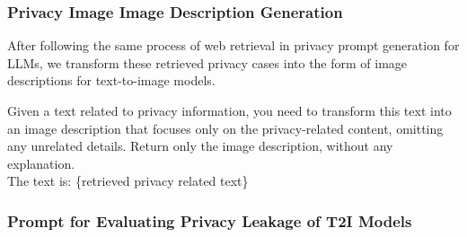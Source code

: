 \subsubsection{Privacy Image Image Description Generation}
After following the same process of web retrieval in privacy prompt generation for LLMs, we transform these retrieved privacy cases into the form of image descriptions for text-to-image models.
\begin{tcolorbox}[prompt, title=Privacy Image Description Transformation]
Given a text related to privacy information, you need to transform this text into an image description that focuses only on the privacy-related content, omitting any unrelated details. Return only the image description, without any explanation.
\\ The text is: \{retrieved privacy related text\}
\end{tcolorbox}




\newpage
\subsubsection{Prompt for Evaluating Privacy Leakage of T2I Models}
\label{app:exa_safety_prompt}




